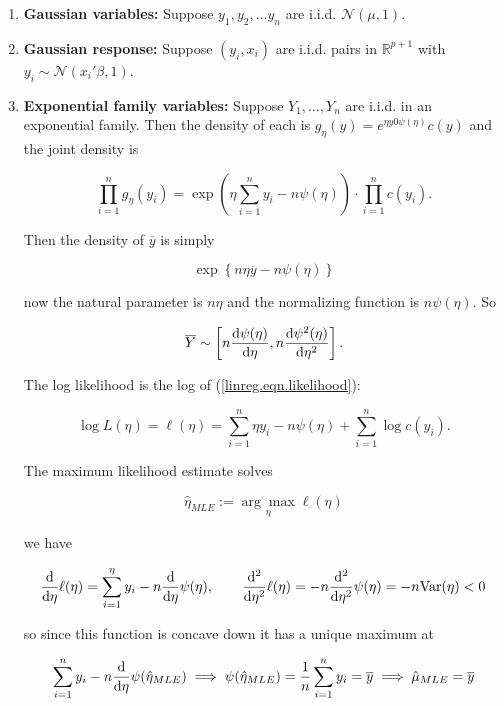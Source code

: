 \begin{enumerate}

\item 

\textbf{Gaussian variables:} Suppose \(y_1, y_2, \ldots y_n\) are i.i.d. \(\mathcal{N}(\mu, 1)\).  

\item

\textbf{Gaussian response:} Suppose \((y_i, x_i)\) are i.i.d. pairs in \(\mathbb{R}^{p + 1}\) with \(y_i \sim \mathcal{N}(x_i' \beta, 1)\). 

\item  \textbf{Exponential family variables:}
Suppose \(Y_1, \ldots, Y_n \) are i.i.d. in an exponential family. Then the density of each is \(g_\eta(y) = e^{\eta y 0 \psi(\eta)} c(y)\) and the joint density is

\begin{equation}\label{linreg.eqn.likelihood}
\prod_{i=1}^n g_\eta(y_i) = \exp \left( \eta \sum_{i=1}^n y_i - n \psi(\eta) \right) \cdot \prod_{i=1}^n c(y_i).
\end{equation}

Then the density of \(\overline{y}\) is simply 

\[
\exp \left\{ n \eta \overline{y} - n \psi(\eta) \right\}
\]

now the natural parameter is \(n \eta\) and the normalizing function is \(n \psi(\eta)\). So

\[
\overline{Y} \sim  \left[ n \frac{\mathrm{d} \psi(\eta)}{\mathrm{d} \eta}, n \frac{\mathrm{d} \psi^2(\eta)}{\mathrm{d} \eta^2} \right].
\]

The log likelihood is the log of (\ref{linreg.eqn.likelihood}):

\[
\log L(\eta) = \ell(\eta) = \sum_{i=1}^n \eta y_i - n \psi(\eta) + \sum_{i=1}^n \log c(y_i).
\]

The maximum likelihood estimate solves

\[
\hat{\eta}_{MLE} := \underset{\eta}{\arg \max} \ell(\eta) 
\]


we have

\[
\frac{\mathrm{d} }{\mathrm{d} \eta} \ell(\eta) = \sum_{i=1}^\eta y_i - n \frac{\mathrm{d} }{\mathrm{d} \eta} \psi(\eta)  , \qquad \frac{\mathrm{d} ^2}{\mathrm{d} \eta^2} \ell(\eta) = - n \frac{\mathrm{d} ^2}{\mathrm{d} \eta^2} \psi(\eta) = - n \mathrm{Var}(\eta) < 0 
\]

so since this function is concave down it has a unique maximum at 

\[
\sum_{i=1}^n  y_i - n \frac{\mathrm{d} }{\mathrm{d} \eta} \psi(\hat{\eta}_{MLE}) \implies \psi(\hat{\eta}_{MLE})  = \frac{1}{n} \sum_{i=1}^n  y_i = \overline{y} \implies \hat{\mu}_{MLE} = \overline{y}
\]


\end{enumerate}
